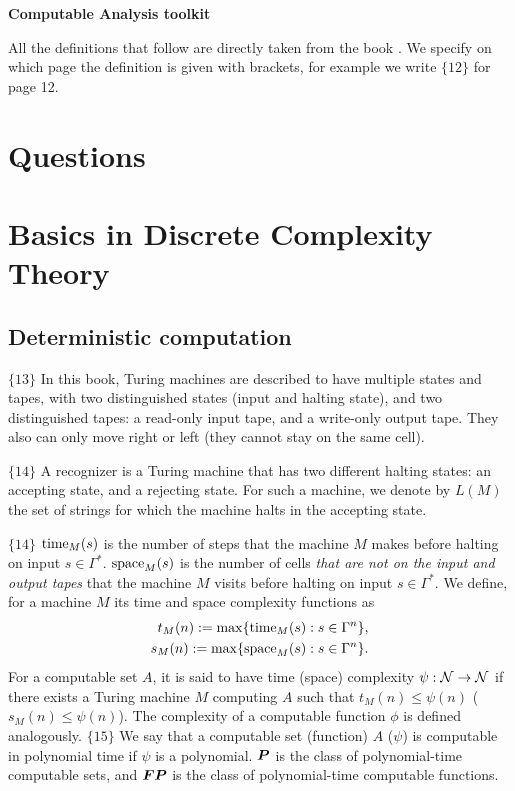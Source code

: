 \documentclass{article}
\begin{document}
\begin{center}
    \textbf{Computable Analysis toolkit}
\end{center}

All the definitions that follow are directly taken from the book \cite{keri1991realcomplexity}. We specify on which page the definition is given with brackets, for example we write $\{12\}$ for page 12.

\section{Questions}

\section{Basics in Discrete Complexity Theory}

\subsection{Deterministic computation}

$\{13\}$ In this book, Turing machines are described to have multiple states and tapes, with two distinguished states (input and halting state), and two distinguished tapes: a read-only input tape, and a write-only output tape. They also can only move right or left (they cannot stay on the same cell).

$\{14\}$ A recognizer is a Turing machine that has two different halting states: an accepting state, and a rejecting state. For such a machine, we denote by $L(M)$ the set of strings for which the machine halts in the accepting state.

$\{14\}$ $\operatorname{time}_M(s)$ is the number of steps that the machine $M$ makes before halting on input $s \in \Gamma^\ast$. $\operatorname{space}_M(s)$ is the number of cells \textit{that are not on the input and output tapes} that the machine $M$ visits before halting on input $s \in \Gamma^\ast$. We define, for a machine $M$ its time and space complexity functions as 
\begin{align}
    t_M(n) := \max \{\operatorname{time}_M(s) : s \in \Gamma^n \},\\
    s_M(n) := \max \{\operatorname{space}_M(s) : s \in \Gamma^n \}.
\end{align}
For a computable set $A$, it is said to have time (space) complexity $\psi : \mathcal{N} \to \mathcal{N}$ if there exists a Turing machine $M$ computing $A$ such that $t_M(n) \leq \psi(n)$ ($s_M(n) \leq \psi(n)$). The complexity of a computable function $\phi$ is defined analogously. $\{15\}$ We say that a computable set (function) $A$ ($\psi$) is computable in polynomial time if $\psi$ is a polynomial. $\boldsymbol{P}$ is the class of polynomial-time computable sets, and $\boldsymbol{FP}$ is the class of polynomial-time computable functions.
\end{document}
